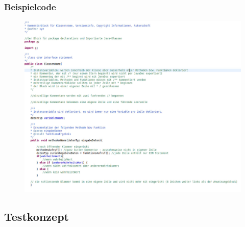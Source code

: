 \documentclass[11pt,a4paper]{article}
\begin{document}
\subsubsection{Beispielcode}

\begin{figure}[htb]
  \centering
  \includegraphics[scale=0.3]{Unbenannt.jpg}
  \label{PNFs}
\end{figure} 



\subsection{Testkonzept}
\end{document}
